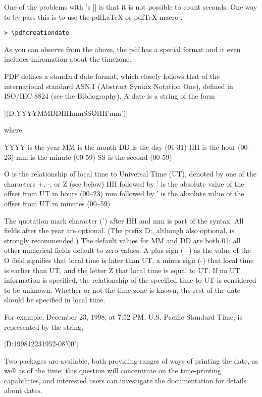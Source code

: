 One of the problems with \tex's |\time| is that it is not possible to count seconds. One way to by-pass this is to use the pdfLaTeX or pdfTeX macro
.


\texttt{> \textbackslash pdfcreationdate}

\texttt{\pdfcreationdate}

As you can observe from the above, the pdf has a special format and it even includes infromation about the timezone.

PDF defines a standard date format, which closely follows that of the international standard ASN.1 (Abstract Syntax Notation One), defined in ISO/IEC 8824 (see the Bibliography). A date is a string of the form

|(D:YYYYMMDDHHmmSSOHH'mm')|

where

\begin{teX}
YYYY is the year
MM is the month
DD is the day (01-31)
HH is the hour (00-23)
mm is the minute (00-59)
SS is the second (00-59)
\end{teX}


O is the relationship of local time to Universal Time (UT), denoted by one of the characters +, -, or Z (see below)
HH followed by ' is the absolute value of the offset from UT in hours (00–23)
mm followed by ' is the absolute value of the offset from UT in minutes (00–59)

The quotation mark character (') after HH and mm is part of the syntax. All fields after the year are optional. (The prefix D:, although also optional, is strongly recommended.) The default values for MM and DD are both 01; all other numerical fields default to zero values. A plus sign (+) as the value of the O field signifies that local time is later than UT, a minus sign (-) that local time is earlier than UT, and the letter Z that local time is equal to UT. If no UT information is specified, the relationship of the specified time to UT is considered to be unknown. Whether or not the time zone is known, the rest of the date should be specified in local time.

For example, December 23, 1998, at 7:52 PM, U.S. Pacific Standard Time, is represented by the string,


|D:199812231952-08'00'|


Two packages are available, both providing ranges of ways of printing the date, as well as of the time: this question will concentrate on the time-printing capabilities, and interested users can investigate the documentation for details about dates.



